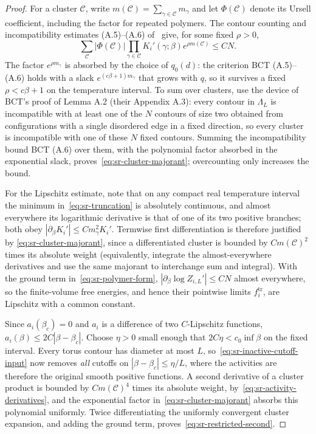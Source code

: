 \begin{proof}
For a cluster $\mathcal C$, write
$m(\mathcal C)=\sum_{\gamma\in\mathcal C}m_\gamma$ and let
$\Phi(\mathcal C)$ denote its Ursell coefficient, including the
factor for repeated polymers. The contour counting and incompatibility
estimates (A.5)--(A.6) of~\cite{BorgsChayesTetali2012} give, for some fixed $\rho>0$,
\begin{equation}
 \sum_{\mathcal C}|\Phi(\mathcal C)|
       \prod_{\gamma\in\mathcal C}K_i'(\gamma;\beta)
       e^{\rho m(\mathcal C)}\le CN.
 \label{eq:sr-cluster-majorant}
\end{equation}
The factor $e^{\rho m_\gamma}$ is absorbed by the choice of
$q_0(d)$: the criterion BCT (A.5)--(A.6) holds with a slack
$e^{(c\beta+1)m_\gamma}$ that grows with $q$, so it survives a fixed
$\rho<c\beta+1$ on the temperature interval. To sum over clusters, use
the device of BCT's proof of Lemma A.2 (their Appendix A.3): every
contour in $\Lambda_L$ is incompatible with at least one of the $N$
contours of size two obtained from configurations with a single
disordered edge in a fixed direction, so every cluster is incompatible
with one of these $N$ fixed contours. Summing the incompatibility bound
BCT (A.6) over them, with the polynomial factor absorbed in the
exponential slack, proves~\eqref{eq:sr-cluster-majorant}; overcounting
only increases the bound.

For the Lipschitz estimate, note that on any compact real temperature
interval the minimum in~\eqref{eq:sr-truncation} is absolutely
continuous, and almost everywhere its logarithmic derivative is that of
one of its two positive branches; both obey
$|\partial_\beta K_i'|\le Cm_\gamma^2K_i'$.
Termwise first differentiation is therefore justified by
\eqref{eq:sr-cluster-majorant}, since a differentiated cluster is bounded
by $C m(\mathcal C)^2$ times its absolute weight (equivalently,
integrate the almost-everywhere derivatives and use the same majorant
to interchange sum and integral). With the ground term
in~\eqref{eq:sr-polymer-form}, $|\partial_\beta\log Z_{i,L}'|\le CN$
almost everywhere, so the finite-volume free energies, and hence their
pointwise limits $f_i^{\mathrm{tr}}$, are Lipschitz with a common
constant.

Since $a_i(\beta_c)=0$ and $a_i$ is a difference of two $C$-Lipschitz
functions,
$a_i(\beta)\le 2C|\beta-\beta_c|$. Choose $\eta>0$ small enough that
$2C\eta<c_0\inf\beta$ on the fixed interval. Every torus contour has
diameter at most $L$, so~\eqref{eq:sr-inactive-cutoff-input} now removes
\emph{all} cutoffs on $|\beta-\beta_c|\le\eta/L$, where the activities
are therefore the original smooth positive functions. A second
derivative of a cluster product is bounded by $C m(\mathcal C)^4$ times
its absolute weight, by~\eqref{eq:sr-activity-derivatives}, and the
exponential factor in~\eqref{eq:sr-cluster-majorant} absorbs this
polynomial uniformly. Twice differentiating the uniformly convergent
cluster expansion, and adding the ground term,
proves~\eqref{eq:sr-restricted-second}.


\end{proof}
